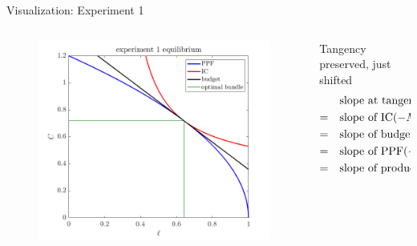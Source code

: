 \documentclass[11pt,aspectratio=43]{beamer}
\theoremstyle{definition}
\begin{document}
\begin{frame}{Visualization: Experiment 1}
\label{slide:Visualization__Experiment_1}
    \begin{columns}
        \begin{column}{0.5\textwidth}
            \begin{figure}
                \includegraphics[width=\textwidth]{./figures/Exp1.png}
            \end{figure}
        \end{column}
        \begin{column}{0.5\textwidth}
            Tangency preserved, just \alert{shifted}
            \begin{align*}
                    & \text{slope at tangency } \alert{( C_{1}, l_{1} )}
                \\
                = \quad
                    & \text{slope of IC} (-MRS_{l, C})
                \\
                = \quad
                    & \text{slope of budget line} (-w)
                \\
                = \quad
                    & \text{slope of PPF} (-MRT_{l, C})
                \\
                = \quad
                    & \text{slope of production fcn} (-MPN)
            \end{align*}
        \end{column}
    \end{columns}
\end{frame}
\end{document}
